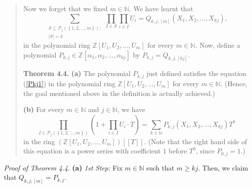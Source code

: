 \documentclass[12pt,final,notitlepage,onecolumn,german]{article}%
\begin{document}
\begin{quote}
Now we forget that we fixed $m\in\mathbb{N}$. We have learnt that%
\[
\sum_{\substack{S\subseteq\mathcal{P}_{j}\left(  \left\{  1,2,...,m\right\}
\right)  ;\\\left\vert S\right\vert =k}}\prod_{I\in S}\prod_{i\in I}%
U_{i}=Q_{k,j,\left[  m\right]  }\left(  X_{1},X_{2},...,X_{kj}\right)  ,
\]
in the polynomial ring $\mathbb{Z}\left[  U_{1},U_{2},...,U_{m}\right]  $ for
every $m\in\mathbb{N}$. Now, define a polynomial $P_{k,j}\in\mathbb{Z}\left[
\alpha_{1},\alpha_{2},...,\alpha_{kj}\right]  $ by $P_{k,j}=Q_{k,j,\left[
kj\right]  }.$

\textbf{Theorem 4.4.} \textbf{(a)} The polynomial $P_{k,j}$ just defined
satisfies the equation (\ref{Pkj1}) in the polynomial ring $\mathbb{Z}\left[
U_{1},U_{2},...,U_{m}\right]  $ for every $m\in\mathbb{N}$. (Hence, the goal
mentioned above in the definition is actually achieved.)

\textbf{(b)} For every $m\in\mathbb{N}$ and $j\in\mathbb{N}$, we have%
\begin{equation}
\prod_{I\in\mathcal{P}_{j}\left(  \left\{  1,2,...,m\right\}  \right)
}\left(  1+\prod_{i\in I}U_{i}\cdot T\right)  =\sum_{k\in\mathbb{N}}%
P_{k,j}\left(  X_{1},X_{2},...,X_{kj}\right)  T^{k} \label{Pkj2}%
\end{equation}
in the ring $\left(  \mathbb{Z}\left[  U_{1},U_{2},...,U_{m}\right]  \right)
\left[  \left[  T\right]  \right]  $. (Note that the right hand side of this
equation is a power series with coefficient $1$ before $T^{0}$, since
$P_{0,j}=1$.)
\end{quote}

\textit{Proof of Theorem 4.4.} \textbf{(a)} \textit{1st Step:} Fix
$m\in\mathbb{N}$ such that $m\geq kj$. Then, we claim that $Q_{k,j,\left[
m\right]  }=P_{k,j}$.
\end{document}
